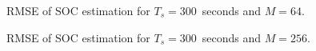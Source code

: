 \documentclass[../zhang_thesis.tex]{subfiles}
\begin{document}
\begin{figure}[h]
\centering
%
\caption{RMSE of SOC estimation for $T_s=300$~seconds and $M=64$.}
\label{fig:rmse_300_64}
\end{figure}

\begin{figure}
\centering
%
\caption{RMSE of SOC estimation for $T_s=300$~seconds and $M=256$.}
\label{fig:rmse_300_256}
\end{figure}
\end{document}
